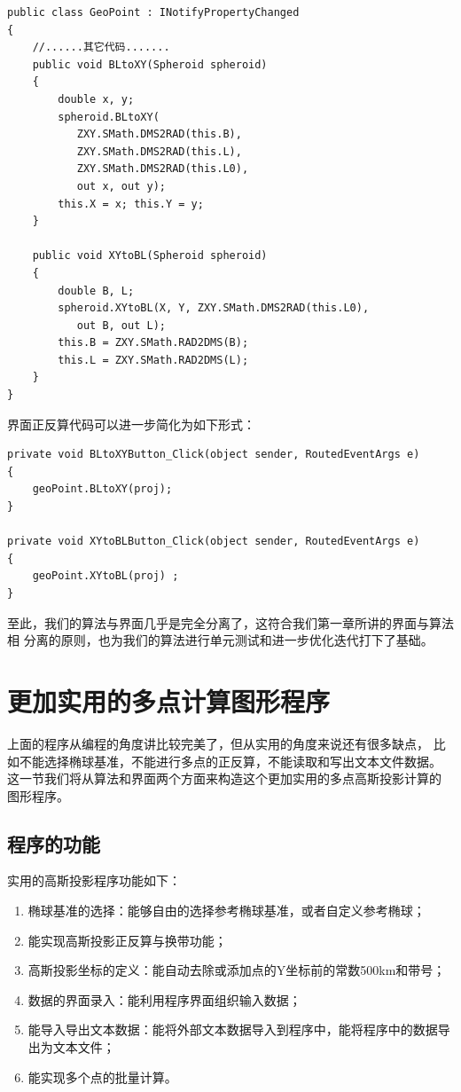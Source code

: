 \begin{lstlisting}
public class GeoPoint : INotifyPropertyChanged
{
    //......其它代码.......
    public void BLtoXY(Spheroid spheroid)
    {
        double x, y;
        spheroid.BLtoXY(
           ZXY.SMath.DMS2RAD(this.B),
           ZXY.SMath.DMS2RAD(this.L),
           ZXY.SMath.DMS2RAD(this.L0),
           out x, out y);
        this.X = x; this.Y = y;
    }

    public void XYtoBL(Spheroid spheroid)
    {
        double B, L;
        spheroid.XYtoBL(X, Y, ZXY.SMath.DMS2RAD(this.L0),
           out B, out L);
        this.B = ZXY.SMath.RAD2DMS(B);
        this.L = ZXY.SMath.RAD2DMS(L);
    }
}
\end{lstlisting}

界面正反算代码可以进一步简化为如下形式：

\begin{lstlisting}
private void BLtoXYButton_Click(object sender, RoutedEventArgs e)
{
    geoPoint.BLtoXY(proj);
}

private void XYtoBLButton_Click(object sender, RoutedEventArgs e)
{
    geoPoint.XYtoBL(proj) ;
}
\end{lstlisting}

至此，我们的算法与界面几乎是完全分离了，这符合我们第一章所讲的界面与算法相
分离的原则，也为我们的算法进行单元测试和进一步优化迭代打下了基础。


\section{更加实用的多点计算图形程序}

上面的程序从编程的角度讲比较完美了，但从实用的角度来说还有很多缺点，
比如不能选择椭球基准，不能进行多点的正反算，不能读取和写出文本文件数据。
这一节我们将从算法和界面两个方面来构造这个更加实用的多点高斯投影计算的
图形程序。

\subsection{程序的功能}

实用的高斯投影程序功能如下：

\begin{enumerate}
    \item 椭球基准的选择：能够自由的选择参考椭球基准，或者自定义参考椭球；
    \item 能实现高斯投影正反算与换带功能；
    \item 高斯投影坐标的定义：能自动去除或添加点的Y坐标前的常数500km和带号；
    \item 数据的界面录入：能利用程序界面组织输入数据；
    \item 能导入导出文本数据：能将外部文本数据导入到程序中，能将程序中的数据导出为文本文件；
    \item 能实现多个点的批量计算。
\end{enumerate}

